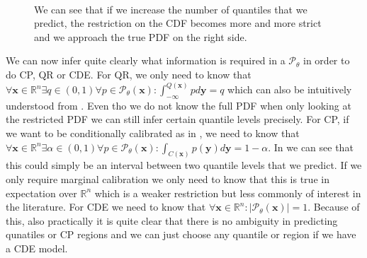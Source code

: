 \begin{figure}
    \centering
    \\

    \caption{We can see that if we increase the number of quantiles that we predict, the restriction on the CDF becomes more and more strict and we approach the true PDF on the right side.}
\end{figure}

We can now infer quite clearly what information is required in a $\mathscr{P}_{\theta}$ in order to do CP, QR or CDE. For QR, we only need to know that
$\forall \mathbf{x} \in \mathbb{R}^n \exists q \in (0,1) \forall p\in \mathscr{P}_{\theta}(\mathbf{x}): \int_{-\infty}^{Q(\mathbf{x})} p d\mathbf{y} = q$ which can also be intuitively understood from . Even tho we do not know the full PDF when only looking at the restricted PDF we can still infer certain quantile levels precisely. For CP, if we want to be conditionally calibrated as in \cite{sesia2021conformal}, we need to know that $\forall \mathbf{x} \in \mathbb{R}^n \exists \alpha \in (0,1) \forall p\in \mathscr{P}_{\theta}(\mathbf{x}): \int_{C(\mathbf{x})} p(\mathbf{y}) d\mathbf{y} = 1 - \alpha$. In  we can see that this could simply be an interval between two quantile levels that we predict. If we only require marginal calibration we only need to know that this is true in expectation over $\mathbb{R}^n$ which is a weaker restriction but less commonly of interest in the literature. For CDE we need to know that $\forall \mathbf{x} \in \mathbb{R}^n: |\mathscr{P}_{\theta}(\mathbf{x})| = 1$. Because of this, also practically it is quite clear that there is no ambiguity in predicting qunatiles or CP regions and we can just choose any quantile or region if we have a CDE model.

